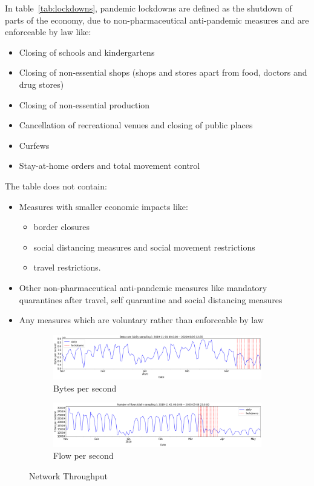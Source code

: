 \documentclass[10pt, journal, letterpaper]{IEEEtran}
\begin{document}
In table~\ref{tab:lockdowns}, pandemic lockdowns are defined as the shutdown of parts of the economy, due to non-pharmaceutical anti-pandemic measures and are enforceable by law like:
\begin{itemize}
    \item Closing of schools and kindergartens
    \item Closing of non-essential shops (shops and stores apart from food, doctors and drug stores)
    \item Closing of non-essential production
    \item Cancellation of recreational venues and closing of public places
    \item Curfews
    \item Stay-at-home orders and total movement control
\end{itemize}
The table does not contain:
\begin{itemize}
    \item Measures with smaller economic impacts like:
    \begin{itemize}
        \item border closures
        \item social distancing measures and social movement restrictions
        \item travel restrictions.
    \end{itemize}
    \item Other non-pharmaceutical anti-pandemic measures like mandatory quarantines after travel, self quarantine and social distancing measures
    \item Any measures which are voluntary rather than enforceable by law 
\end{itemize}


\begin{figure}
    \begin{subfigure}{\textwidth}
          \centering
          \includegraphics[width=\columnwidth]{img/traffic_trend_bps.png}
          \caption{Bytes per second}
          \label{fig:traffic_trend_bps}
    \end{subfigure}
    \begin{subfigure}{\textwidth}
          \centering
          \includegraphics[width=\columnwidth]{img/traffic_trend_fps.png}
          \caption{Flow per second}
          \label{fig:traffic_trend_fps}
    \end{subfigure}
    \caption{Network Throughput}
    \label{fig:network_throughput}
\end{figure}
\end{document}
